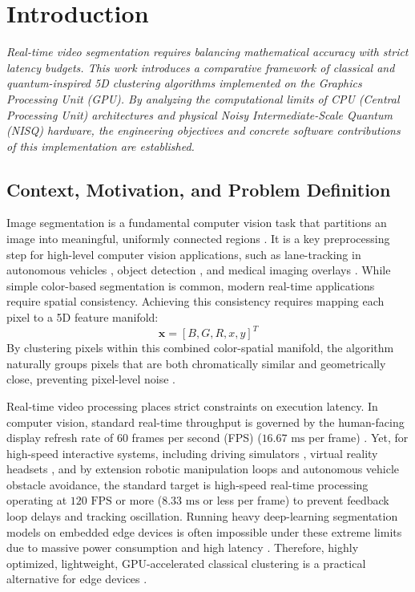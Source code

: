 \chapter{Introduction}
\label{intro}
{\itshape Real-time video segmentation requires balancing mathematical accuracy with strict latency budgets. This work introduces a comparative framework of classical and quantum-inspired 5D clustering algorithms implemented on the Graphics Processing Unit (GPU). By analyzing the computational limits of CPU (Central Processing Unit) architectures and physical Noisy Intermediate-Scale Quantum (NISQ) hardware, the engineering objectives and concrete software contributions of this implementation are established.}

\section{Context, Motivation, and Problem Definition}
Image segmentation is a fundamental computer vision task that partitions an image into meaningful, uniformly connected regions \cite{gonzalez2009digital}. It is a key preprocessing step for high-level computer vision applications, such as lane-tracking in autonomous vehicles \cite{janai2020computer}, object detection \cite{redmon2016you}, and medical imaging overlays \cite{pham2000current}. While simple color-based segmentation is common, modern real-time applications require spatial consistency. Achieving this consistency requires mapping each pixel to a 5D feature manifold:
\begin{equation}
\mathbf{x} = [B, G, R, x, y]^T
\end{equation}
By clustering pixels within this combined color-spatial manifold, the algorithm naturally groups pixels that are both chromatically similar and geometrically close, preventing pixel-level noise \cite{achanta2012slic}.

Real-time video processing places strict constraints on execution latency. In computer vision, standard real-time throughput is governed by the human-facing display refresh rate of 60 frames per second (FPS) ($16.67\text{ ms}$ per frame) \cite{DHANANI20135}. Yet, for high-speed interactive systems, including driving simulators \cite{cruden2019simulator}, virtual reality headsets \cite{jerald2009scene}, and by extension robotic manipulation loops and autonomous vehicle obstacle avoidance, the standard target is high-speed real-time processing operating at $120\text{ FPS}$ or more ($8.33\text{ ms}$ or less per frame) to prevent feedback loop delays and tracking oscillation. Running heavy deep-learning segmentation models on embedded edge devices is often impossible under these extreme limits due to massive power consumption and high latency \cite{paszke2016enet,slimani2019k}. Therefore, highly optimized, lightweight, GPU-accelerated classical clustering is a practical alternative for edge devices \cite{mucke2019hardware}.

